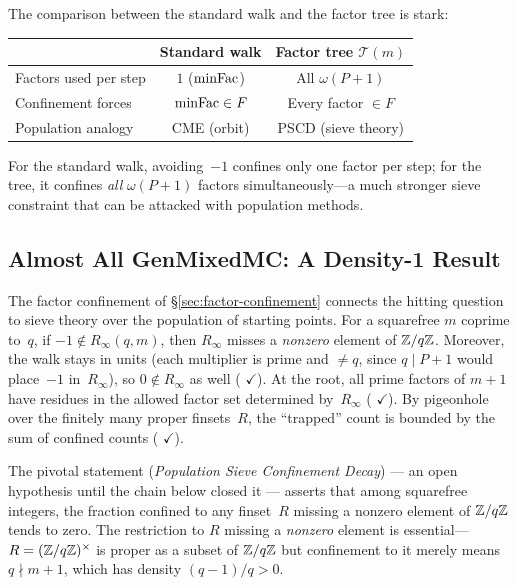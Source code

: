 \noindent
The comparison between the standard walk and the factor tree is stark:
\smallskip
\begin{center}
\begin{tabular}{@{}l@{\quad}c@{\quad}c@{}}
\toprule
 & \textbf{Standard walk} & \textbf{Factor tree} $\mathcal{T}(m)$ \\
\midrule
Factors used per step & $1$ ($\mathrm{minFac}$) & All $\omega(P{+}1)$ \\
Confinement forces & $\mathrm{minFac} \in F$ & Every factor $\in F$ \\
Population analogy & CME (orbit) & PSCD (sieve theory) \\
\bottomrule
\end{tabular}
\end{center}

\smallskip\noindent
For the standard walk, avoiding~$-1$ confines only one factor per
step; for the tree, it confines \emph{all} $\omega(P{+}1)$ factors
simultaneously---a much stronger sieve constraint that can be
attacked with population methods.

\subsection{Almost All GenMixedMC: A Density-1 Result}
\label{sec:almost-all-mixed}

The factor confinement of \S\ref{sec:factor-confinement} connects
the hitting question to sieve theory over the population of starting
points.  For a squarefree $m$ coprime to~$q$, if
$-1 \notin R_\infty(q,m)$, then $R_\infty$ misses a
\emph{nonzero} element of $\mathbb{Z}/q\mathbb{Z}$.  Moreover, the walk stays in
units (each multiplier is prime and $\neq q$, since $q \mid P{+}1$
would place~$-1$ in~$R_\infty$), so
$0 \notin R_\infty$ as well
(
{\color{leanink}$\checkmark$}).
At the root, all prime factors of $m{+}1$ have residues in the
allowed factor set determined by~$R_\infty$
(
{\color{leanink}$\checkmark$}).
By pigeonhole over the finitely many proper finsets~$R$, the
``trapped'' count is bounded by the sum of confined counts
(
{\color{leanink}$\checkmark$}).

The pivotal statement 
(\emph{Population Sieve Confinement Decay}) --- an open hypothesis
until the chain below closed it --- asserts that among
squarefree integers, the fraction confined to any finset~$R$ missing
a nonzero element of $\mathbb{Z}/q\mathbb{Z}$ tends to zero.
The restriction to $R$ missing a
\emph{nonzero} element is essential---$R =
(\mathbb{Z}/q\mathbb{Z})^\times$ is proper as a subset of $\mathbb{Z}/q\mathbb{Z}$
but confinement to it merely means $q \nmid m{+}1$,
which has density $(q{-}1)/q > 0$.


